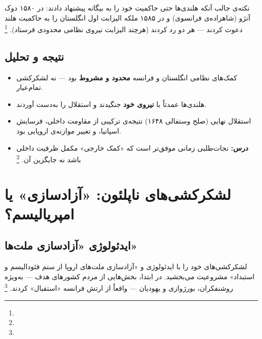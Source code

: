 نکته‌ی جالب آنکه هلندی‌ها حتی حاکمیت خود را به بیگانه پیشنهاد دادند: در ۱۵۸۰ دوک آنژو (شاهزاده‌ی فرانسوی) و در ۱۵۸۵ ملکه الیزابت اول انگلستان را به حاکمیت هلند دعوت کردند — هر دو رد کردند (هرچند الیزابت نیروی نظامی محدودی فرستاد).%
\footnote{}

\subsection{نتیجه و تحلیل}

\begin{tcolorbox}[casebox, title={نتایج نجات‌طلبی هلندی‌ها}]
\begin{itemize}[nosep, rightmargin=1em]
  \item کمک‌های نظامی انگلستان و فرانسه \textbf{محدود و مشروط} بود — نه لشکرکشی تمام‌عیار.
  \item هلندی‌ها عمدتاً با \textbf{نیروی خود} جنگیدند و استقلال را به‌دست آوردند.
  \item استقلال نهایی (صلح وستفالی ۱۶۴۸) نتیجه‌ی ترکیبی از مقاومت داخلی، فرسایش اسپانیا، و تغییر موازنه‌ی اروپایی بود.
  \item \textbf{درس:} نجات‌طلبی زمانی موفق‌تر است که «کمک خارجی» مکمل ظرفیت داخلی باشد نه جایگزین آن.%
  \footnote{}
\end{itemize}
\end{tcolorbox}

\section{لشکرکشی‌های ناپلئون: «آزادسازی» یا امپریالیسم؟}
\label{sec:ch08-napoleon}

\subsection{ایدئولوژی «آزادسازی ملت‌ها»}

 لشکرکشی‌های خود را با ایدئولوژی  و «آزادسازی ملت‌های اروپا از ستم فئودالیسم و استبداد» مشروعیت می‌بخشید. در ابتدا، بخش‌هایی از مردم کشورهای هدف — به‌ویژه روشنفکران، بورژوازی و یهودیان — واقعاً از ارتش فرانسه «استقبال» کردند.%
\footnote{}

